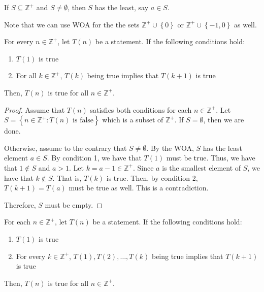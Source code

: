 \begin{theorem}
    If \(S \subseteq \mathbb{Z}^+\) and \(S \neq \emptyset\), then \(S\) has the least, say \(a \in S\).
\end{theorem}

\begin{distraction}
    Note that we can use WOA for the the sets \(\mathbb{Z}^+ \cup \left\{0\right\}\) or \(\mathbb{Z}^+ \cup \left\{-1, 0\right\}\) as well.
\end{distraction}

\begin{theorem}
    For every \(n \in \mathbb{Z}^+\), let \(T(n)\) be a statement. If the following conditions hold:
    \begin{enumerate}
        \item \(T(1)\) is true
        \item For all \(k \in \mathbb{Z}^+\), \(T(k)\) being true implies that \(T(k+1)\) is true
    \end{enumerate}
    Then, \(T(n)\) is true for all \(n \in \mathbb{Z}^+\).
\end{theorem}

\begin{proof}
    Assume that \(T(n)\) satisfies both conditions for each \(n \in \mathbb{Z}^+\). Let \(S = \left\{n \in \mathbb{Z}^+ : T(n) \text{ is false}\right\}\) which is a subset of \(\mathbb{Z}^+\). If \(S = \emptyset\), then we are done.

    Otherwise, assume to the contrary that \(S \neq \emptyset\). By the WOA, \(S\) has the least element \(a \in S\). By condition 1, we have that \(T(1)\) must be true. Thus, we have that \(1 \notin S\) and \(a > 1\). Let \(k = a - 1 \in \mathbb{Z}^+\). Since \(a\) is the smallest element of \(S\), we have that \(k \notin S\). That is, \(T(k)\) is true. Then, by condition 2, \(T(k+1) = T(a)\) must be true as well. This is a contradiction.

    Therefore, \(S\) must be empty.
\end{proof}

\begin{theorem}
    For each \(n \in \mathbb{Z}^+\), let \(T(n)\) be a statement. If the following conditions hold:
    \begin{enumerate}
        \item \(T(1)\) is true
        \item For every \(k \in \mathbb{Z}^+\), \(T(1), T(2), \ldots, T(k)\) being true implies that \(T(k+1)\) is true
    \end{enumerate}
    Then, \(T(n)\) is true for all \(n \in \mathbb{Z}^+\).
\end{theorem}

